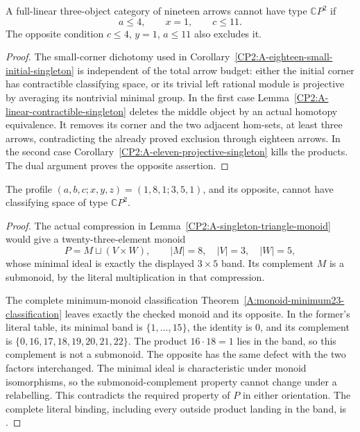 \begin{corollary}
\label{CP2:A-nineteen-small-initial-singleton}
A full-linear three-object category of nineteen arrows cannot
have type $\mathbb CP^2$ if
\[
 a\leq4,\qquad x=1,\qquad c\leq11.
\]
The opposite condition $c\leq4$, $y=1$, $a\leq11$ also excludes it.
\end{corollary}
\begin{proof}
The small-corner dichotomy used in
Corollary~\ref{CP2:A-eighteen-small-initial-singleton} is independent
of the total arrow budget: either the initial corner has
contractible classifying space, or its trivial left rational
module is projective by averaging its nontrivial minimal group.
In the first case Lemma~\ref{CP2:A-linear-contractible-singleton}
deletes the middle object by an actual homotopy equivalence.
It removes its corner and the two adjacent hom-sets, at least
three arrows, contradicting the already proved exclusion through
eighteen arrows.  In the second case
Corollary~\ref{CP2:A-eleven-projective-singleton} kills the products.
The dual argument proves the opposite assertion.
\end{proof}

\begin{proposition}
\label{CP2:A-nineteen-three-five-singleton-triangle}
The profile $(a,b,c;x,y,z)=(1,8,1;3,5,1)$, and its opposite,
cannot have classifying space of type $\mathbb CP^2$.
\end{proposition}
\begin{proof}
The actual compression in
Lemma~\ref{CP2:A-singleton-triangle-monoid} would give a
twenty-three-element monoid
\[
 P=M\sqcup(V\times W),\qquad |M|=8,\quad |V|=3,\quad |W|=5,
\]
whose minimal ideal is exactly the displayed $3\times5$ band.
Its complement $M$ is a submonoid, by the literal multiplication
in that compression.

The complete minimum-monoid classification
Theorem~\ref{A:monoid-minimum23-classification} leaves exactly
the checked monoid and its opposite.  In the former's literal
table, its minimal band is $\{1,\ldots,15\}$, the identity is $0$,
and its complement is $\{0,16,17,18,19,20,21,22\}$.
The product $16\cdot18=1$ lies in the band, so this complement
is not a submonoid.  The opposite has the same defect with
the two factors interchanged.  The minimal ideal is characteristic
under monoid isomorphisms, so the submonoid-complement property
cannot change under a relabelling.  This contradicts the required
property of $P$ in either orientation.
The complete literal binding, including every outside product
landing in the band, is
.
\end{proof}

